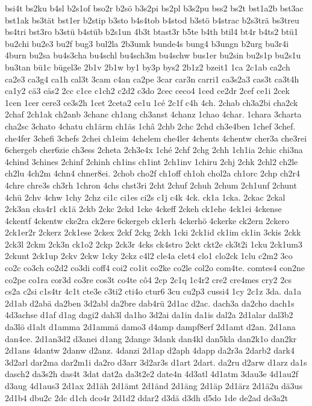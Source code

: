 {bsi4t
bs2ku
b4sl
b2s1of
bso2r
b2sö
b3s2pi
bs2pl
b3s2pu
bss2
bs2t
bst1a2b
bst3ac
bst1ak
bs3tät
bst1er
b2stip
b3sto
b4s4tob
b4stod
b3stö
b4strac
b2s3trä
bs3treu
bs4tri
bst3ro
b3stü
b4stüb
b2s1un
4b3t
btast3r
b5te
b4th
btil4
bt4r
b4ts2
btü1
bu2chi
bu2e3
bu2f
bug3
bul2la
2b3umk
bunde4s
bung4
b3ungn
b2urg
bu3r4i
4burn
bu2sa
bu4s3cha
bu4schl
bu4sch3m
bu4schw
bus1er
bu2sin
bu2s1p
bu2s1u
bu3tan
bü1c
bügel3e
2b1v
2b1w
by1
by3p
bys2
2b1z2
bzeit1
1ca
2c1ab
ca2ch
ca2e3
ca3g4
ca1h
cal3t
3cam
c4an
ca2pe
3car
car3n
carri1
ca3s2a3
cas3t
ca3t4h
ca1y2
cä3
cäs2
2cc
c1ce
c1ch2
c2d2
c3do
2cec
ceco4
1ced
ce2dr
2cef
ce1i
2cek
1cen
1cer
cere3
ce3s2h
1cet
2ceta2
ce1u
1cé
2c1f
c4h
4ch.
2chab
ch3a2bi
cha2ck
2chaf
2ch1ak
ch2anb
3chanc
ch1ang
ch3anst
4chanz
1chao
4char.
1chara
3charta
cha2sc
3chato
4chatu
ch1ärm
ch1äs
1châ
2chb
2chc
2chd
ch3e4ben
1chef
3chef.
che4fer
3chefi
3chefs
2chei
ch1eim
4chelem
che4ler
4chents
4chentw
cher3a
che3rei
6chergeb
cher6zie
ch3ess
2cheta
2ch3e4x
1ché
2chf
2chg
2chh
1ch1ia
2chic
chi3na
4chind
3chines
2chinf
2chinh
ch1ins
ch1int
2ch1inv
1chiru
2chj
2chk
2chl2
ch2le
ch2lu
4ch2m
4chn4
chner8ei.
2chob
cho2f
ch1off
ch1oh
chol2a
ch1orc
2chp
ch2r4
4chre
chre3s
ch3rh
1chron
4chs
chst3ri
2cht
2chuf
2chuh
2chum
2ch1unf
2chunt
4chü
2chv
4chw
1chy
2chz
ci1c
ci1es
ci2s
c1j
c4k
4ck.
ck1a
1cka.
2ckac
2ckal
2ck3an
cka4r1
ck1ä
2ckb
2ckc
2ckd
1cke
4ckeff
2ckeh
ck1ehe
4ck1ei
4ckense
4ckentf
4ckentw
cke2ra
ck2ere
6ckergeb
ck1erh
4ckerhö
4ckerke
ck2ern
2ckero
2ck1er2r
2ckerz
2ck1ese
2ckex
2ckf
2ckg
2ckh
1cki
2ck1id
ck1im
ck1in
3ckis
2ckk
2ck3l
2ckm
2ck3n
ck1o2
2ckp
2ck3r
4cks
ck4stro
2ckt
ckt2e
ck3t2i
1cku
2ck1um3
2ckunt
2ck1up
2ckv
2ckw
1cky
2ckz
c4l2
cle4a
clet4
clo1
clo2ck
1clu
c2m2
3co
co2c
co3ch
co2d2
co3di
coff4
coi2
co1it
co2ke
co2le
col2o
com4te.
comtes4
con2ne
co2pe
co1ra
cor3d
co3re
cos3t
co4te
cô4
2cp
2c1q
1c4r2
cre2
cre4mes
cry2
2cs
cs2a
c2si
c1s4tr
4c1t
cte3e
c3ti2
cti4o
ctur6
3cu
cu2p3
cussi4
1cy
2c1z
3da.
da1a
2d1ab
d2abä
da2ben
3d2abl
da2bre
dab4rü
2d1ac
d2ac.
dach3a
da2cho
dach1s
4d3achse
d1af
d1ag
dagi2
dah3l
da1ho
3d2ai
da1in
da1is
dal2a
2d1alar
dal3b2
da3lö
d1alt
d1amma
2d1ammä
damo3
d4amp
dampf8erf
2d1amt
d2an.
2d1ana
dan4ce.
2d1an3d2
d3anei
d1ang
2dange
3dank
dan4kl
dan5kla
dan2k1o
dan2kr
2d1ans
4dantw
2danw
d2anz.
4danzi
2d1ap
d2aph
4dapp
da2r3a
2darb2
dark4
3d2arl
dar2ma
dar2m1i
da2ro
d3arr
3d2ar3s
d1art
2dart.
da2ru
d2arw
d1arz
da1s
dasch2
da3s2h
das4t
3dat
dat2a
da3t2e2
date4n
4d3atl
4d1atm
3dau3e
4d1au2f
d3aug
4d1aus3
2d1ax
2d1äh
2d1ämt
2d1änd
2d1äng
2d1äp
2d1ärz
2d1ä2u
dä3us
2d1b4
dbu2c
2dc
d1ch
dco4r
2d1d2
ddar2
d3dä
d3dh
d5do
1de
de2ad
de3a2t
}
